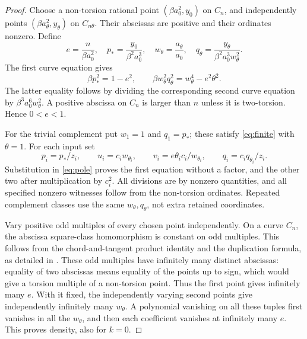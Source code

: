 \documentclass[11pt,a4paper]{article}
\theoremstyle{definition}\newtheorem{definition}[theorem]{Definition}
\theoremstyle{remark}\newtheorem{remark}[theorem]{Remark}
\begin{document}
\begin{proof}
Choose a non-torsion rational point $(\beta a_0^2,y_0)$ on $C_n$,
and independently points $(\beta a_\theta^2,y_\theta)$ on
$C_{n\theta}$. Their abscissas are positive and their ordinates
nonzero. Define
\[
 e=\frac{n}{\beta a_0^2},\quad
 p_* =\frac{y_0}{\beta^2a_0^3},\quad
 w_\theta=\frac{a_\theta}{a_0},\quad
 q_\theta=\frac{y_\theta}{\beta^2a_0^3w_\theta^2}.
\]
The first curve equation gives
\begin{equation}\label{eq:finite}
 \beta p_*^2=1-e^2,\qquad
 \beta w_\theta^2q_\theta^2=w_\theta^4-e^2\theta^2.
\end{equation}
The latter equality follows by dividing the corresponding second curve
equation by $\beta^3a_0^6w_\theta^2$. A positive abscissa on $C_n$ is larger than $n$
unless it is two-torsion. Hence $0<e<1$.

For the trivial complement put $w_1=1$ and $q_1=p_*$; these satisfy
\eqref{eq:finite} with $\theta=1$. For each input set
\begin{equation}\label{eq:maps}
 p_i=p_*/z_i,\qquad u_i=c_iw_{\theta_i},\qquad
 v_i=e\theta_i c_i/w_{\theta_i},\qquad
 q_i=c_iq_{\theta_i}/z_i.
\end{equation}
Substitution in \eqref{eq:pole} proves the first equation without a
factor, and the other two after multiplication by $c_i^2$. All divisions
are by nonzero quantities, and all specified nonzero witnesses follow
from the non-torsion ordinates. Repeated complement classes use the same
$w_\theta,q_\theta$, not extra retained coordinates.

Vary positive odd multiples of every chosen point independently. On a
curve $C_n$, the abscissa square-class homomorphism is constant on odd
multiples. This follows from the chord-and-tangent product identity
and the duplication formula, as detailed in \cite{Joint}. These odd
multiples have infinitely many distinct abscissas: equality of two
abscissas means equality of the points up to sign, which would give a
torsion multiple of a non-torsion point. Thus the first point gives
infinitely many $e$. With it fixed, the independently varying second
points give independently infinitely many $w_\theta$. A polynomial
vanishing on all these tuples first vanishes in all the $w_\theta$,
and then each coefficient vanishes at infinitely many $e$. This proves
density, also for $k=0$.


\end{proof}
\end{document}
